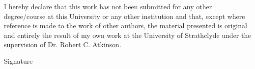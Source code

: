 \vspace*{\fill}
I hereby declare that this work has not been submitted for any other degree/course at this University or any other institution and that, except where reference is made to the work of other authors, the material presented is original and entirely the result of my own work at the University of Strathclyde under the supervision of Dr. Robert C. Atkinson.

\begin{center}
Signature\hspace{0.5cm} \makebox[1.5in]{\hrulefill}
\end{center}
\vspace*{\fill}
\pagebreak